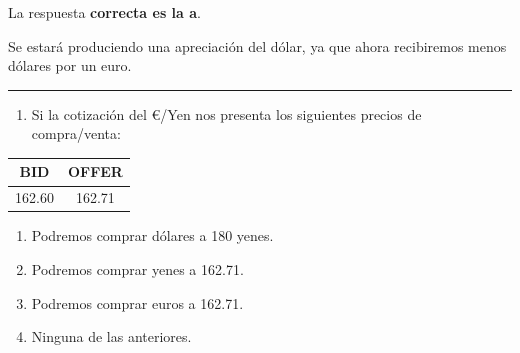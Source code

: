 \documentclass[
  letterpaper,
  DIV=11,
  numbers=noendperiod]{scrreprt}
\providecommand{\tightlist}{%
  \setlength{\itemsep}{0pt}\setlength{\parskip}{0pt}}\usepackage{longtable,booktabs,array}
\begin{document}
\begin{tcolorbox}[enhanced jigsaw, left=2mm, opacityback=0, colback=white, breakable, arc=.35mm, bottomrule=.15mm, rightrule=.15mm, toprule=.15mm, leftrule=.75mm, colframe=quarto-callout-tip-color-frame]
\begin{minipage}[t]{5.5mm}
\textcolor{quarto-callout-tip-color}{\faLightbulb}
\end{minipage}%
\begin{minipage}[t]{\textwidth - 5.5mm}

La respuesta \textbf{correcta es la a}.

Se estará produciendo una apreciación del dólar, ya que ahora
recibiremos menos dólares por un euro.

\end{minipage}%
\end{tcolorbox}

\begin{center}\rule{0.5\linewidth}{0.5pt}\end{center}

\begin{enumerate}
\def\labelenumi{\arabic{enumi}.}
\setcounter{enumi}{13}
\tightlist
\item
  Si la cotización del €/Yen nos presenta los siguientes precios de
  compra/venta:
\end{enumerate}

\begin{longtable}[]{@{}cc@{}}
\toprule()
BID & OFFER \\
\midrule()
\endhead
162.60 & 162.71 \\
\bottomrule()
\end{longtable}

\begin{enumerate}
\def\labelenumi{\alph{enumi})}
\item
  Podremos comprar dólares a 180 yenes.
\item
  Podremos comprar yenes a 162.71.
\item
  Podremos comprar euros a 162.71.
\item
  Ninguna de las anteriores.
\end{enumerate}
\end{document}
